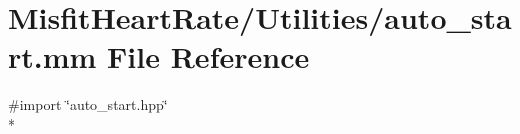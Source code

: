 \hypertarget{auto__start_8mm}{\section{Misfit\+Heart\+Rate/\+Utilities/auto\+\_\+start.mm File Reference}
\label{auto__start_8mm}
}
{\ttfamily \#import \char`\"{}auto\+\_\+start.\+hpp\char`\"{}}\\*
